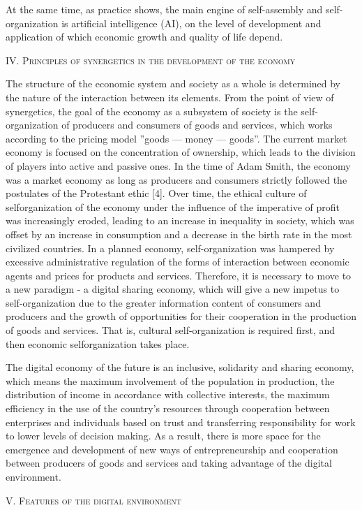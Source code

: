 \documentclass{article}
\begin{document}
\begin{multicols}{2}
At the same time, as practice shows, the main engine of self-assembly and self-organization is artificial intelligence (AI), on the level of development and application of which economic growth and quality of life depend.
\begin{center}
\vspace{-5pt}
    \large{\textsc{IV. Principles of synergetics in the
development of the economy}}
\vspace{-5pt}
\end{center}

The structure of the economic system and society as
a whole is determined by the nature of the interaction
between its elements. From the point of view of synergetics, the goal of the economy as a subsystem of
society is the self-organization of producers and consumers of goods and services, which works according
to the pricing model ”goods — money — goods”. The
current market economy is focused on the concentration
of ownership, which leads to the division of players into
active and passive ones. In the time of Adam Smith, the
economy was a market economy as long as producers
and consumers strictly followed the postulates of the
Protestant ethic [4]. Over time, the ethical culture of selforganization of the economy under the influence of the
imperative of profit was increasingly eroded, leading to
an increase in inequality in society, which was offset by
an increase in consumption and a decrease in the birth
rate in the most civilized countries.
In a planned economy, self-organization was hampered
by excessive administrative regulation of the forms of
interaction between economic agents and prices for products and services. Therefore, it is necessary to move to a new paradigm - a digital sharing economy, which
will give a new impetus to self-organization due to the
greater information content of consumers and producers
and the growth of opportunities for their cooperation in
the production of goods and services. That is, cultural
self-organization is required first, and then economic selforganization takes place.

The digital economy of the future is an inclusive, solidarity and sharing economy, which means the maximum
involvement of the population in production, the distribution of income in accordance with collective interests, the
maximum efficiency in the use of the country’s resources
through cooperation between enterprises and individuals
based on trust and transferring responsibility for work
to lower levels of decision making. As a result, there
is more space for the emergence and development of
new ways of entrepreneurship and cooperation between
producers of goods and services and taking advantage of
the digital environment.
\begin{center}
\vspace{-5pt}
    \large{\textsc{V. Features of the digital environment}}
    \vspace{-10pt}
\end{center}


\end{multicols}
\end{document}
